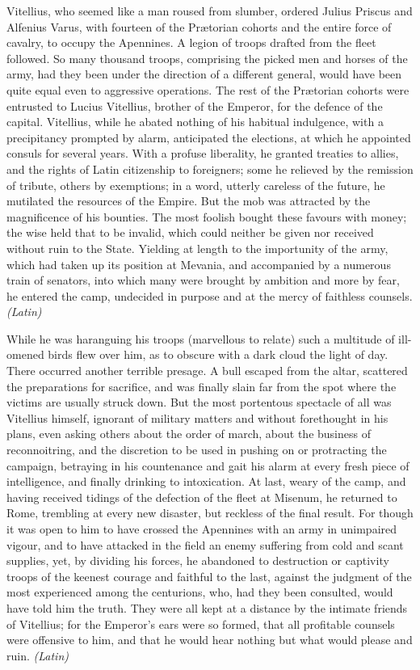 Vitellius, who seemed like a man roused from slumber, ordered Julius Priscus and Alfenius Varus, with fourteen of the Prætorian cohorts and the entire force of cavalry, to occupy the Apennines. A legion of troops drafted from the fleet followed. So many thousand troops, comprising the picked men and horses of the army, had they been under the direction of a different general, would have been quite equal even to aggressive operations. The rest of the Prætorian cohorts were entrusted to Lucius Vitellius, brother of the Emperor, for the defence of the capital. Vitellius, while he abated nothing of his habitual indulgence, with a precipitancy prompted by alarm, anticipated the elections, at which he appointed consuls for several years. With a profuse liberality, he granted treaties to allies, and the rights of Latin citizenship to foreigners; some he relieved by the remission of tribute, others by exemptions; in a word, utterly careless of the future, he mutilated the resources of the Empire. But the mob was attracted by the magnificence of his bounties. The most foolish bought these favours with money; the wise held that to be invalid, which could neither be given nor received without ruin to the State. Yielding at length to the importunity of the army, which had taken up its position at Mevania, and accompanied by a numerous train of senators, into which many were brought by ambition and more by fear, he entered the camp, undecided in purpose and at the mercy of faithless counsels. \emph{(Latin)}


While he was haranguing his troops (marvellous to relate) such a multitude of ill-omened birds flew over him, as to obscure with a dark cloud the light of day. There occurred another terrible presage. A bull escaped from the altar, scattered the preparations for sacrifice, and was finally slain far from the spot where the victims are usually struck down. But the most portentous spectacle of all was Vitellius himself, ignorant of military matters and without forethought in his plans, even asking others about the order of march, about the business of reconnoitring, and the discretion to be used in pushing on or protracting the campaign, betraying in his countenance and gait his alarm at every fresh piece of intelligence, and finally drinking to intoxication. At last, weary of the camp, and having received tidings of the defection of the fleet at Misenum, he returned to Rome, trembling at every new disaster, but reckless of the final result. For though it was open to him to have crossed the Apennines with an army in unimpaired vigour, and to have attacked in the field an enemy suffering from cold and scant supplies, yet, by dividing his forces, he abandoned to destruction or captivity troops of the keenest courage and faithful to the last, against the judgment of the most experienced among the centurions, who, had they been consulted, would have told him the truth. They were all kept at a distance by the intimate friends of Vitellius; for the Emperor's ears were so formed, that all profitable counsels were offensive to him, and that he would hear nothing but what would please and ruin. \emph{(Latin)}

